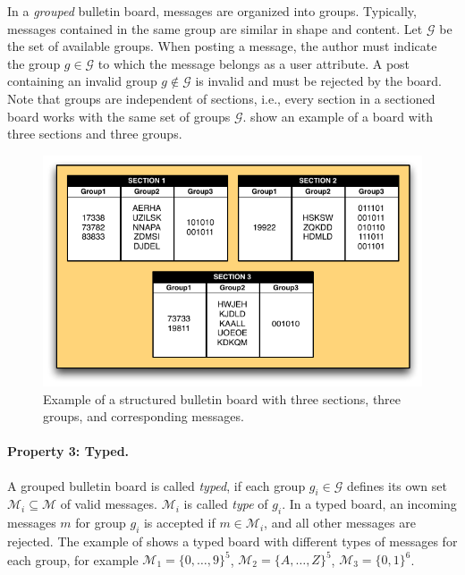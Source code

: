 \documentclass[bibtotoc,halfparskip,oneside]{scrreprt}
\begin{document}
	In a \emph{grouped} bulletin board, messages are organized into groups. Typically, messages contained in the same group are similar in shape and content. Let $\mathcal{G}$ be the set of available  groups. When posting a message, the author must indicate the group $g\in\mathcal{G}$ to which the message belongs as a user attribute. A post containing an invalid group $g\not\in\mathcal{G}$ is invalid and must be rejected by the board. Note that groups are independent of sections, i.e., every section in a sectioned board works with the same set of groups $\mathcal{G}$.  show an example of a board with three sections and three groups.
	
	\begin{figure}[ht]
		\includegraphics[width=\textwidth]{figures/fig1}
		\caption{Example of a structured bulletin board with three sections, three groups, and corresponding messages.}
		\label{fig1}
	\end{figure}
	
	\paragraph*{Property 3: Typed.}
	A grouped bulletin board is called \emph{typed}, if each group $g_i\in\mathcal{G}$ defines its own set  $\mathcal{M}_i\subseteq \mathcal{M}$ of valid messages. $\mathcal{M}_i$ is called \emph{type} of $g_i$.  In a typed board, an incoming messages $m$ for group $g_i$ is accepted if $m\in\mathcal{M}_i$, and all other messages are rejected. The example of  shows a typed board with different types of messages for each group, for example $\mathcal{M}_1=\{0,\ldots,9\}^5$, $\mathcal{M}_2=\{A,\ldots,Z\}^5$, $\mathcal{M}_3=\{0,1\}^6$.
	
\end{document}
